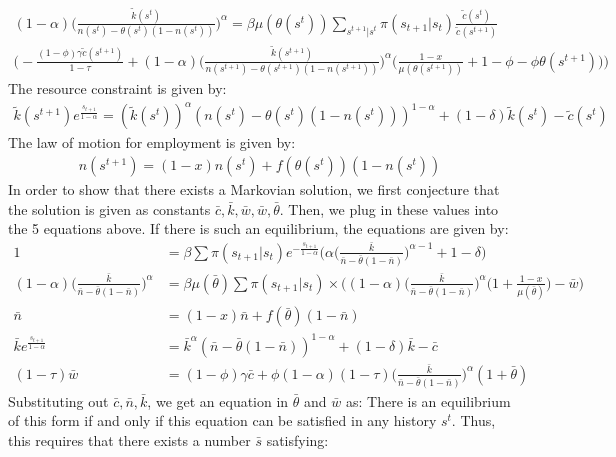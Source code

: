 \documentclass[11pt,letterpaper]{article}
\begin{document}
\begin{enumerate}
\begin{align*}
  (1-\alpha) \bigg(\frac{\tilde{k}(s^t)}{n(s^t) -
  \theta(s^t)(1-n(s^t))} \bigg)^{\alpha} = \beta \mu(\theta(s^t))
  \sum_{s^{t+1}|s^t} \pi(s_{t+1}|s_t)
  \frac{\tilde{c}(s^t)}{\tilde{c}(s^{t+1})}\\ \bigg(-
  \frac{(1-\phi)\gamma \tilde{c}(s^{t+1})}{1-\tau} + (1-\alpha) \bigg(
  \frac{\tilde{k}(s^{t+1})}{n(s^{t+1}) - \theta(s^{t+1})(1-n(s^{t+1}))}
  \bigg)^{\alpha} \bigg(\frac{1-x}{\mu(\theta(s^{t+1}))} + 1 -\phi -
  \phi \theta(s^{t+1}) \bigg)\bigg)
\end{align*}
The resource constraint is given by:
\begin{align*}
  \tilde{k}(s^{t+1}) e^{\frac{s_{t+1}}{1-\alpha}} =
  (\tilde{k}(s^t))^{\alpha} (n(s^t) - \theta(s^t)(1-n(s^t)))^{1-\alpha}
  + (1-\delta) \tilde{k}(s^t) -\tilde{c}(s^t)
\end{align*}
The law of motion for employment is given by:
\begin{align*}
  n(s^{t+1}) = (1-x) n(s^t) + f(\theta(s^t))(1-n(s^t))
\end{align*}
In order to show that there exists a Markovian solution, we first
conjecture that the solution is given as constants $\bar{c}, \bar{k},
\bar{w}, \bar{w}, \bar{\theta}$. Then, we
plug in these values into the 5 equations above. If there is such an
equilibrium, the equations
are given by:
\begin{align*}
  1 &= \beta \sum \pi(s_{t+1}|s_t) e^{-\frac{s_{t+1}}{1-\alpha}}
  \bigg(\alpha \bigg(\frac{\bar{k}}{\bar{n} -
  \bar{\theta}(1-\bar{n})}\bigg)^{\alpha-1} + 1 - \delta\bigg)\\
  (1-\alpha)
  \bigg(\frac{\bar{k}}{\bar{n}-\bar{\theta}(1-\bar{n})}\bigg)^{\alpha}
  &= \beta \mu(\bar{\theta}) \sum \pi(s_{t+1}|s_t)
  \times \bigg((1-\alpha) \bigg(\frac{\bar{k}}{\bar n - \bar \theta
  (1-\bar n)}\bigg)^{\alpha} \bigg(1 + \frac{1-x}{\mu(\bar \theta)}
  \bigg) - \bar{w}\bigg)\\
  \bar n &= (1-x)\bar n + f(\bar \theta) (1-\bar n)\\
  \bar k e^{\frac{s_{t+1}}{1-\alpha}} &= \bar k^{\alpha} (\bar n - \bar
  \theta (1-\bar n))^{1-\alpha} + (1-\delta) \bar k - \bar c\\
  (1-\tau) \bar w &= (1-\phi) \gamma \bar c + \phi (1-\alpha) (1-\tau)
  \bigg(\frac{\bar k}{\bar n - \bar \theta (1-\bar n)} \bigg)^{\alpha} (1+\bar \theta)
\end{align*}
Substituting out $\bar c, \bar n, \bar k$, we get an equation in
$\bar \theta$ and $\bar w$ as:
There is an equilibrium of this form if and only if this equation can
be satisfied in any history $s^t$. Thus, this requires that there
exists a number $\bar s$ satisfying:


\end{enumerate}
\end{document}

